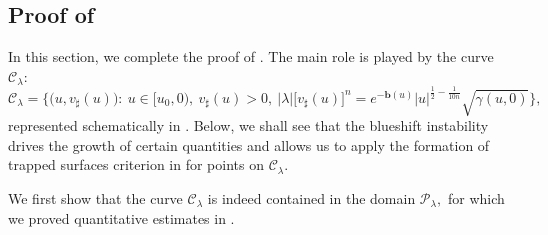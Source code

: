 \documentclass[11pt]{article}
\numberwithin{equation}{section}
\begin{document}
\subsection{Proof of }\label{proof of instability thm section}
In this section, we complete the proof of . The main role is played by the curve $\mathcal{C}_{\lambda}$:
\begin{equation}\label{definition of C lambda}
    \mathcal{C}_{\lambda}=\Big\{\big(u,v_{\sharp}(u)\big):\ u\in[u_0,0),\ v_{\sharp}(u)>0,\ |\lambda|\big[v_{\sharp}(u)\big]^{n}=e^{-\mathbf{b}(u)}|u|^{\frac{1}{2}-\frac{1}{10n}}\sqrt{\gamma(u,0)}\Big\},
\end{equation} 
represented schematically in . Below, we shall see that the blueshift instability drives the growth of certain quantities and allows us to  apply the formation of trapped surfaces criterion in  for points on $\mathcal{C}_{\lambda}.$

We first show that the curve $\mathcal{C}_{\lambda}$ is indeed contained in the domain $\mathcal{P}_{\lambda},$ for which we proved quantitative estimates in .
\end{document}
